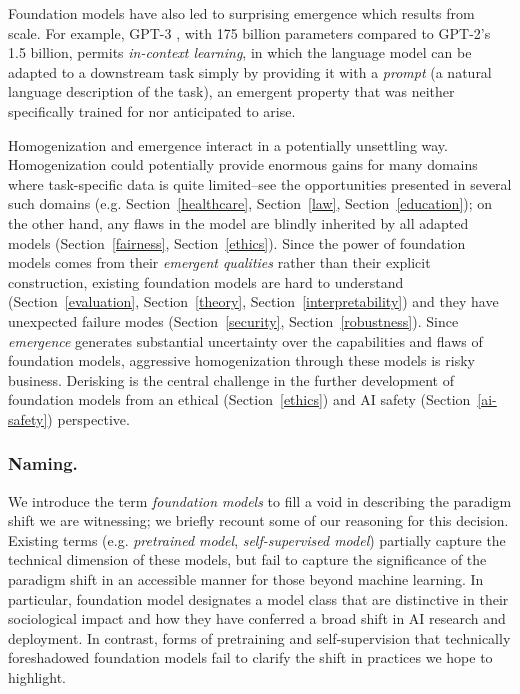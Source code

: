 Foundation models have also led to surprising emergence which results from scale. For example, GPT-3 \citep{brown2020gpt3}, with 175 billion parameters compared to GPT-2's 1.5 billion, permits \emph{in-context learning}, in which the language model can be adapted to a downstream task simply by providing it with a \emph{prompt} (a natural language description of the task), an emergent property that was neither specifically trained for nor anticipated to arise.

Homogenization and emergence interact in a potentially unsettling way. Homogenization could potentially provide enormous gains for many domains where task-specific data is quite limited--see the  opportunities presented in several such domains (e.g. Section~\ref{healthcare}, Section~\ref{law}, Section~\ref{education});
on the other hand, any flaws in the model are blindly inherited by all adapted models (Section~\ref{fairness}, Section~\ref{ethics}).
Since the power of foundation models comes from their \emph{emergent qualities} rather than their explicit construction, existing foundation models are hard to understand (Section~\ref{evaluation}, Section~\ref{theory}, Section~\ref{interpretability})
and they have unexpected failure modes (Section~\ref{security}, Section~\ref{robustness}).
Since \emph{emergence} generates substantial uncertainty over the capabilities and flaws of foundation models, aggressive homogenization through these models is risky business. Derisking is the central challenge in the further development of foundation models from an ethical (Section~\ref{ethics}) and AI safety (Section~\ref{ai-safety}) perspective.

\subsubsection{Naming.}
\label{sec:naming}

We introduce the term \textit{foundation models} to fill a void in describing the paradigm shift we are witnessing; we briefly recount some of our reasoning for this decision. Existing terms (e.g. \emph{pretrained model}, \emph{self-supervised model}) partially capture the technical dimension of these models, but fail to capture the significance of the paradigm shift in an accessible manner for those beyond machine learning. In particular, foundation model designates a model class that are distinctive in their sociological impact and how they have conferred a broad shift in AI research and deployment. In contrast, forms of pretraining and self-supervision that technically foreshadowed foundation models fail to clarify the shift in practices we hope to highlight.  

